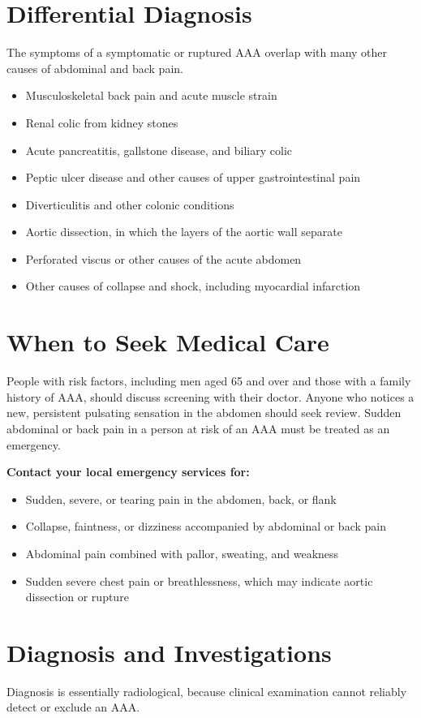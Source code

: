 \section*{Differential Diagnosis}
The symptoms of a symptomatic or ruptured AAA overlap with many other causes of abdominal and back pain.

\begin{itemize}
    \item Musculoskeletal back pain and acute muscle strain
    \item Renal colic from kidney stones
    \item Acute pancreatitis, gallstone disease, and biliary colic
    \item Peptic ulcer disease and other causes of upper gastrointestinal pain
    \item Diverticulitis and other colonic conditions
    \item Aortic dissection, in which the layers of the aortic wall separate
    \item Perforated viscus or other causes of the acute abdomen
    \item Other causes of collapse and shock, including myocardial infarction
\end{itemize}

\section*{When to Seek Medical Care}
People with risk factors, including men aged 65 and over and those with a family history of AAA, should discuss screening with their doctor. Anyone who notices a new, persistent pulsating sensation in the abdomen should seek review. Sudden abdominal or back pain in a person at risk of an AAA must be treated as an emergency.

\textbf{Contact your local emergency services for:}
\begin{itemize}
    \item Sudden, severe, or tearing pain in the abdomen, back, or flank
    \item Collapse, faintness, or dizziness accompanied by abdominal or back pain
    \item Abdominal pain combined with pallor, sweating, and weakness
    \item Sudden severe chest pain or breathlessness, which may indicate aortic dissection or rupture
\end{itemize}

\section*{Diagnosis and Investigations}
Diagnosis is essentially radiological, because clinical examination cannot reliably detect or exclude an AAA.

